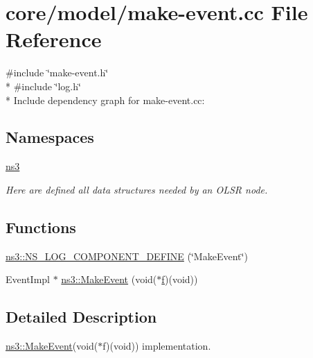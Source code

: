 \hypertarget{make-event_8cc}{}\section{core/model/make-\/event.cc File Reference}
\label{make-event_8cc}
{\ttfamily \#include \char`\"{}make-\/event.\+h\char`\"{}}\\*
{\ttfamily \#include \char`\"{}log.\+h\char`\"{}}\\*
Include dependency graph for make-\/event.cc\+:
\subsection*{Namespaces}
\begin{DoxyCompactItemize}
\item 
 \hyperlink{namespacens3}{ns3}
\begin{DoxyCompactList}\small\item\em Here are defined all data structures needed by an O\+L\+SR node. \end{DoxyCompactList}\end{DoxyCompactItemize}
\subsection*{Functions}
\begin{DoxyCompactItemize}
\item 
\hyperlink{namespacens3_a3b2a52f75cae23428c8e7bd7c558e0ea}{ns3\+::\+N\+S\+\_\+\+L\+O\+G\+\_\+\+C\+O\+M\+P\+O\+N\+E\+N\+T\+\_\+\+D\+E\+F\+I\+NE} (\char`\"{}Make\+Event\char`\"{})
\item 
Event\+Impl $\ast$ \hyperlink{group__makeeventfnptr_ga289a28a2497c18a9bd299e5e2014094b}{ns3\+::\+Make\+Event} (void($\ast$\hyperlink{80211b_8c_ae7ffc1a8f84fa47a0812b2f2b9627132}{f})(void))
\end{DoxyCompactItemize}


\subsection{Detailed Description}
\hyperlink{group__makeeventfnptr_ga289a28a2497c18a9bd299e5e2014094b}{ns3\+::\+Make\+Event}(void($\ast$f)(void)) implementation. 